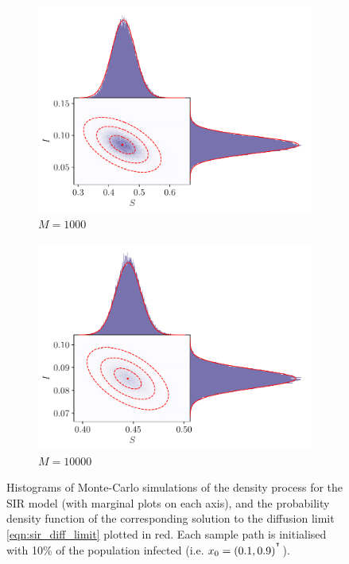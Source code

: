 \begin{figure}
\begin{center}
\begin{subfigure}{0.49\textwidth}
			\includegraphics[width=\textwidth]{chp06_applications/figures/sir/sir_pairwise_1000}
			\caption{\(M = 1000\)}
			\label{fig:sir_gauss_rels_3}
		\end{subfigure}\begin{subfigure}{0.49\textwidth}
			\includegraphics[width=\textwidth]{chp06_applications/figures/sir/sir_pairwise_10000}
			\caption{\(M = 10000\)}
			\label{fig:sir_gauss_rels_4}
		\end{subfigure}
		\caption{Histograms of Monte-Carlo simulations of the density process for the SIR model (with marginal plots on each axis), and the probability density function of the corresponding solution to the diffusion limit \cref{eqn:sir_diff_limit} plotted in red.
			Each sample path is initialised with 10\% of the population infected (i.e. \(x_0 = \left(0.1, 0.9\right)^{^{\intercal}}\)).}
		\label{fig:sir_gauss_rels}
	\end{center}
\end{figure}

